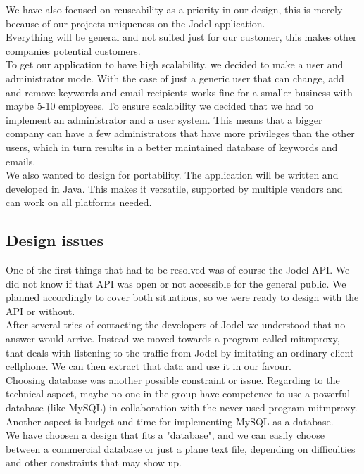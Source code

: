 \documentclass[a4paper,12pt]{article}
\begin{document}
We have also focused on reuseability as a priority in our design, this is merely because of our projects uniqueness on the Jodel application. \\

Everything will be general and not suited just for our customer, this makes other companies potential customers.\\

To get our application to have high scalability, we decided to make a user and administrator mode.
With the case of just a generic user that can change, add and remove keywords and email recipients works fine for a smaller business with maybe 5-10 employees.
To ensure scalability we decided that we had to implement an administrator and a user system. This means that a bigger company can have a few administrators that have more privileges than the other users, which in turn results in a better maintained database of keywords and emails.\\

We also wanted to design for portability. The application will be written and developed in Java. This makes it versatile, supported by multiple vendors and can work on all platforms needed.


\subsection{Design issues}
One of the first things that had to be resolved was of course the Jodel API. We did not know if that API was open or not accessible for the general public. We planned accordingly to cover both situations, so we were ready to design with the API or without. \\

After several tries of contacting the developers of Jodel we understood that no answer would arrive. Instead we moved towards a program called mitmproxy, that deals with listening to the traffic from Jodel by imitating an ordinary client cellphone. We can then extract that data and use it in our favour.\\

Choosing database was another possible constraint or issue. Regarding to the technical aspect, maybe no one in the group have competence to use a powerful database (like MySQL) in collaboration with the never used program mitmproxy. Another aspect is budget and time for implementing MySQL as a database.  \\

We have choosen a design that fits a "database", and we can easily choose between a commercial database or just a plane text file, depending on difficulties and other constraints that may show up.\\
\end{document}
